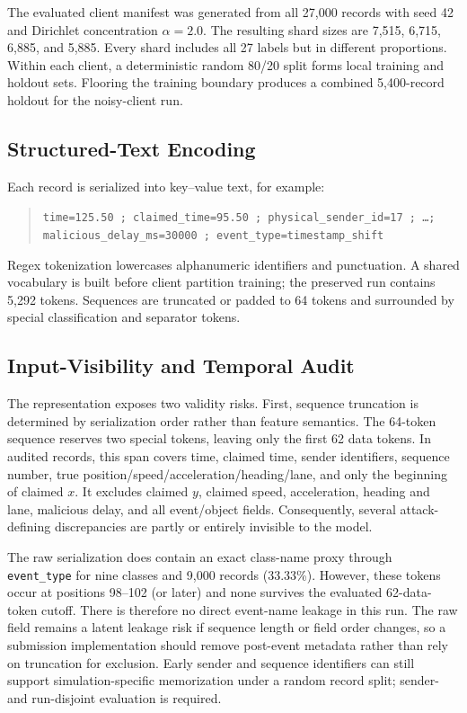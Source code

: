\documentclass[journal]{IEEEtran}
\begin{document}
The evaluated client manifest was generated from all 27,000 records with seed 42 and Dirichlet concentration $\alpha=2.0$. The resulting shard sizes are 7,515, 6,715, 6,885, and 5,885. Every shard includes all 27 labels but in different proportions. Within each client, a deterministic random 80/20 split forms local training and holdout sets. Flooring the training boundary produces a combined 5,400-record holdout for the noisy-client run.

\subsection{Structured-Text Encoding}
Each record is serialized into key--value text, for example:
\begin{quote}\small
\texttt{time=125.50 ; claimed\_time=95.50 ; physical\_sender\_id=17 ; \ldots ; malicious\_delay\_ms=30000 ; event\_type=timestamp\_shift}
\end{quote}
Regex tokenization lowercases alphanumeric identifiers and punctuation. A shared vocabulary is built before client partition training; the preserved run contains 5,292 tokens. Sequences are truncated or padded to 64 tokens and surrounded by special classification and separator tokens.

\subsection{Input-Visibility and Temporal Audit}
The representation exposes two validity risks. First, sequence truncation is determined by serialization order rather than feature semantics. The 64-token sequence reserves two special tokens, leaving only the first 62 data tokens. In audited records, this span covers time, claimed time, sender identifiers, sequence number, true position/speed/acceleration/heading/lane, and only the beginning of claimed $x$. It excludes claimed $y$, claimed speed, acceleration, heading and lane, malicious delay, and all event/object fields. Consequently, several attack-defining discrepancies are partly or entirely invisible to the model.

The raw serialization does contain an exact class-name proxy through \texttt{event\_type} for nine classes and 9,000 records (33.33\%). However, these tokens occur at positions 98--102 (or later) and none survives the evaluated 62-data-token cutoff. There is therefore no direct event-name leakage in this run. The raw field remains a latent leakage risk if sequence length or field order changes, so a submission implementation should remove post-event metadata rather than rely on truncation for exclusion. Early sender and sequence identifiers can still support simulation-specific memorization under a random record split; sender- and run-disjoint evaluation is required.
\end{document}
